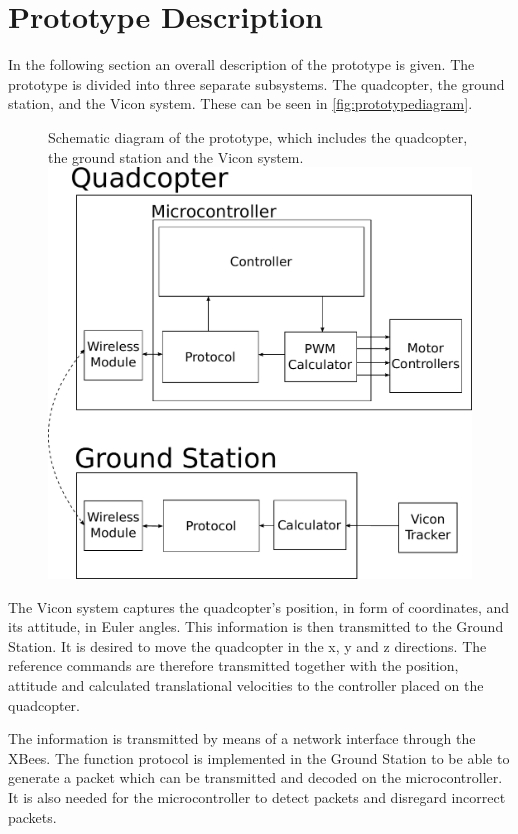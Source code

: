 \section{Prototype Description}\label{sec:PrototypeDescription}
In the following section an overall description of the prototype is given. %
The prototype is divided into three separate subsystems. The quadcopter, the ground station, and the Vicon system. These can be seen in \autoref{fig:prototypediagram}. 
\vspace{-0.2 cm}
\begin{figure}[H]
  \centering
  \captionbox
  {
    Schematic diagram of the prototype, which includes the quadcopter, the ground station and the Vicon system.
    \label{fig:prototypediagram}
  }
  {
    \includegraphics[width=.45\textwidth]{figures/prototypediagram}
  }
\end{figure}
\vspace{-0.7 cm}
The Vicon system captures the quadcopter's position, in form of coordinates, and its attitude, in Euler angles. This information is then transmitted to the Ground Station. It is desired to move the quadcopter in the x, y and z directions. The reference commands are therefore transmitted together with the position, attitude and calculated translational velocities to the controller placed on the quadcopter.

The information is transmitted by means of a network interface through the XBees. The function protocol is implemented in the Ground Station to be able to generate a packet which can be transmitted and decoded on the microcontroller. It is also needed for the microcontroller to detect packets and disregard incorrect packets.

